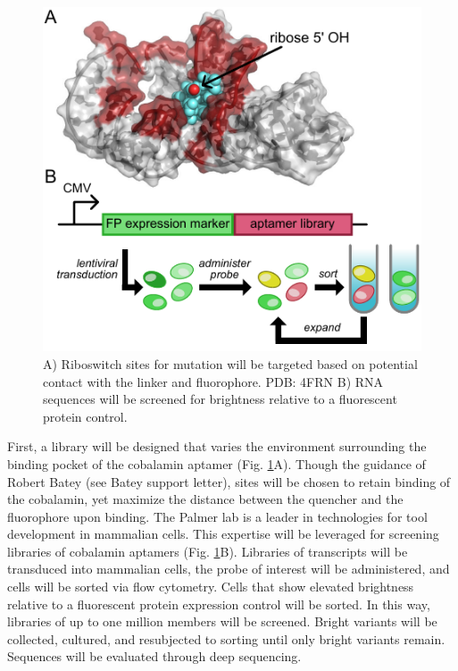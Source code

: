 \begin{figure}
\begin{centering}
\includegraphics[width=\textwidth]{figures/aim2.pdf}

\end{centering}
\footnotesize
\caption{\label{figure:aim2}
A) Riboswitch sites for mutation will be targeted based on potential contact with the linker and fluorophore. PDB: 4FRN\cite{JohnsonJrB12cofactorsdirectly2012} B) RNA sequences will be screened for brightness relative to a fluorescent protein control.
}
\end{figure}

First, a library will be designed that varies the environment surrounding the binding pocket of the cobalamin aptamer (Fig. \ref{figure:aim2}A). Though the guidance of Robert Batey (see Batey support letter), sites will be chosen to retain binding of the cobalamin, yet maximize the distance between the quencher and the fluorophore upon binding.\cite{JohnsonJrB12cofactorsdirectly2012} The Palmer lab is a leader in technologies for tool development in mammalian cells.\cite{FiedlerDropletMicrofluidicFlow2017,DeanHighSpeedMultiparameterPhotophysical2015} This expertise will be leveraged for screening libraries of cobalamin aptamers (Fig. \ref{figure:aim2}B). Libraries of transcripts will be transduced into mammalian cells, the probe of interest will be administered, and cells will be sorted via flow cytometry. Cells that show elevated brightness relative to a fluorescent protein expression control will be sorted.
In this way, libraries of up to one million members will be screened. Bright variants will be collected, cultured, and resubjected to sorting until only bright variants remain. Sequences will be evaluated through deep sequencing.

